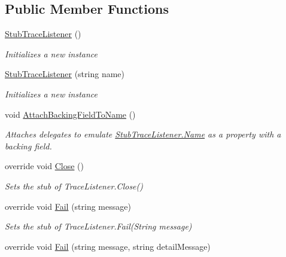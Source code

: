 \subsection*{Public Member Functions}
\begin{DoxyCompactItemize}
\item 
\hyperlink{class_system_1_1_diagnostics_1_1_fakes_1_1_stub_trace_listener_a2a28347450569d37d24f4da631366148}{Stub\-Trace\-Listener} ()
\begin{DoxyCompactList}\small\item\em Initializes a new instance\end{DoxyCompactList}\item 
\hyperlink{class_system_1_1_diagnostics_1_1_fakes_1_1_stub_trace_listener_ac66530ac6a3773746e2245898bb6a146}{Stub\-Trace\-Listener} (string name)
\begin{DoxyCompactList}\small\item\em Initializes a new instance\end{DoxyCompactList}\item 
void \hyperlink{class_system_1_1_diagnostics_1_1_fakes_1_1_stub_trace_listener_a0d772ef735e2b01353f6ef8fb8936c60}{Attach\-Backing\-Field\-To\-Name} ()
\begin{DoxyCompactList}\small\item\em Attaches delegates to emulate \hyperlink{class_system_1_1_diagnostics_1_1_fakes_1_1_stub_trace_listener_ad952ee7da14ca97695bc2d8ede29fc2e}{Stub\-Trace\-Listener.\-Name} as a property with a backing field.\end{DoxyCompactList}\item 
override void \hyperlink{class_system_1_1_diagnostics_1_1_fakes_1_1_stub_trace_listener_a9fddad14b073dce43e0393b3fd77166a}{Close} ()
\begin{DoxyCompactList}\small\item\em Sets the stub of Trace\-Listener.\-Close()\end{DoxyCompactList}\item 
override void \hyperlink{class_system_1_1_diagnostics_1_1_fakes_1_1_stub_trace_listener_a1626515730babdf7c0b0bb899cf344e5}{Fail} (string message)
\begin{DoxyCompactList}\small\item\em Sets the stub of Trace\-Listener.\-Fail(\-String message)\end{DoxyCompactList}\item 
override void \hyperlink{class_system_1_1_diagnostics_1_1_fakes_1_1_stub_trace_listener_a6fea7b04b5f141c2c782e5d9322f901a}{Fail} (string message, string detail\-Message)

\end{DoxyCompactItemize}
